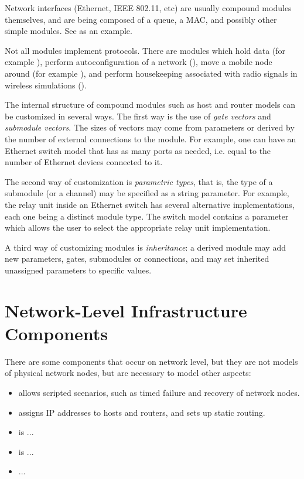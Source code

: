 Network interfaces (Ethernet, IEEE 802.11, etc) are usually compound modules
themselves, and are being composed of a queue, a MAC, and possibly other
simple modules. See  as an example.

Not all modules implement protocols. There are modules which hold data (for
example ), perform autoconfiguration of a network
(), move a mobile node around (for example
), and perform housekeeping associated with
radio signals in wireless simulations ().

The internal structure of compound modules such as host and router models
can be customized in several ways. The first way is the use of \textit{gate
vectors} and \textit{submodule vectors}. The sizes of vectors may come from
parameters or derived by the number of external connections to the module.
For example, one can have an Ethernet switch model that has as many ports
as needed, i.e. equal to the number of Ethernet devices connected to it.

The second way of customization is \textit{parametric types}, that is, the
type of a submodule (or a channel) may be specified as a string parameter.
For example, the relay unit inside an Ethernet switch has several
alternative implementations, each one being a distinct module type. The
switch model contains a parameter which allows the user to select the
appropriate relay unit implementation.

A third way of customizing modules is \textit{inheritance}: a derived
module may add new parameters, gates, submodules or connections, and may
set inherited unassigned parameters to specific values.


\section{Network-Level Infrastructure Components}

There are some components that occur on network level, but they
are not models of physical network nodes, but are necessary 
to model other aspects:

\begin{itemize}
  \item {} allows scripted scenarios, such
     as timed failure and recovery of network nodes.
  \item {} assigns IP addresses 
     to hosts and routers, and sets up static routing.
\item {} is ...
\item {} is ...
\item ...
\end{itemize}

